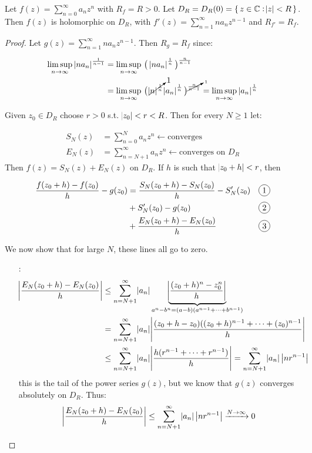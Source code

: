 \begin{theorem}
Let $f(z)= \sum_{n=0}^\infty a_n z^n$ with $R_f = R>0$. Let $D_R = D_R(0) = \set{z\in \mathbb{C} : \abs{z}<R }$. Then $f(z)$ is holomorphic on $D_R$, with $f'(z)= \sum_{n=1}^\infty na_n z^{n-1}$ and $R_{f'} = R_f$.
\end{theorem}

\begin{proof}
Let $g(z) = \sum_{n=1}^\infty na_n z^{n-1}$. Then $R_g=R_f$ since:

\begin{align*}
    \limsup\limits_{n\rightarrow \infty} \, \abs{na_n}^\frac{1}{n-1} &= \limsup\limits_{n\rightarrow \infty} \, \big( \, \abs{na_n}^\frac{1}{n}\big)^{\frac{n}{n-1}}\\
    &= \limsup\limits_{n\rightarrow \infty} \, \big( \, \cancelto{1}{\abs{n}^\frac{1}{n}}\abs{a_n}^\frac{1}{n}\big)^{\cancelto{1}{\frac{n}{n-1}}} = \limsup\limits_{n\rightarrow \infty} \, \abs{a_n}^\frac{1}{n}
\end{align*}

Given $z_0 \in D_R$ choose $r>0$ s.t. $\abs{z_0}<r<R$. Then for every $N\geq 1$ let:

\begin{align*}
    S_N(z) &= \sum_{n=0}^N a_nz^n \leftarrow \text{converges}\\
    E_N(z) &= \sum_{n=N+1}^\infty a_nz^n \leftarrow \text{converges on $D_R$}
\end{align*}
Then $f(z) = S_N(z)+E_N(z)$ on $D_R$. If $h$ is such that $\abs{z_0+h}<r$, then

\begin{align*}
    \frac{f(z_0+h)-f(z_0)}{h} - g(z_0)
    & = \frac{S_N(z_0+h)-S_N(z_0)}{h} - S_N'(z_0)&& \circled{1} \\& +S_N'(z_0)-g(z_0)&& \circled{2} \\& +\frac{E_N(z_0+h)-E_N(z_0)}{h} && \circled{3}
\end{align*}

We now show that for large $N$, these lines all go to zero.

\begin{itemize}
    

    \item[\circled{3} :]
    \begin{align*}
        \abs{\frac{E_N(z_0+h)-E_N(z_0)}{h}} &\leq \sum_{n=N+1}^\infty \abs{a_n} \underbrace{\abs{\frac{(z_0+h)^n-z_0^n}{h}}}_{a^n-b^n=(a-b)(a^{n-1}+\cdots+b^{n-1})}\\
        &= \sum_{n=N+1}^\infty \abs{a_n} \abs{\frac{(z_0+h-z_0)((z_0+h)^{n-1}+\cdots+(z_0)^{n-1}}{h}}\\
        &\leq \sum_{n=N+1}^\infty \abs{a_n} \abs{\frac{h(r^{n-1}+\cdots+r^{n-1})}{h}} = \sum_{n=N+1}^\infty \abs{a_n} \big|nr^{n-1}\big|
    \end{align*}
    this is the tail of the power series $g(z)$, but we know that $g(z)$ converges absolutely on $D_R$. Thus:
    \begin{align*}
        \abs{\frac{E_N(z_0+h)-E_N(z_0)}{h}} \leq \sum_{n=N+1}^\infty \abs{a_n} \big|nr^{n-1}\big| \xrightarrow[]{N \to \infty} 0
    \end{align*}
    

\end{itemize}
\end{proof}
